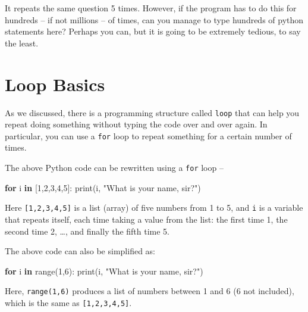\documentclass[
  letterpaper,
]{scrbook}
\newenvironment{Shaded}{\begin{snugshade}}{\end{snugshade}}
\newcommand{\BuiltInTok}[1]{\textcolor[rgb]{0.00,0.23,0.31}{#1}}
\newcommand{\ControlFlowTok}[1]{\textcolor[rgb]{0.00,0.23,0.31}{\textbf{#1}}}
\newcommand{\DecValTok}[1]{\textcolor[rgb]{0.68,0.00,0.00}{#1}}
\newcommand{\KeywordTok}[1]{\textcolor[rgb]{0.00,0.23,0.31}{\textbf{#1}}}
\newcommand{\NormalTok}[1]{\textcolor[rgb]{0.00,0.23,0.31}{#1}}
\newcommand{\StringTok}[1]{\textcolor[rgb]{0.13,0.47,0.30}{#1}}
\begin{document}
It repeats the same question 5 times. However, if the program has to do
this for hundreds -- if not millions -- of times, can you manage to type
hundreds of python statements here? Perhaps you can, but it is going to
be extremely tedious, to say the least.

\section*{Loop Basics}\label{loop-basics}


As we discussed, there is a programming structure called \texttt{loop}
that can help you repeat doing something without typing the code over
and over again. In particular, you can use a \texttt{for} loop to repeat
something for a certain number of times.

The above Python code can be rewritten using a \texttt{for} loop --

\begin{Shaded}
\begin{Highlighting}[]
\ControlFlowTok{for}\NormalTok{ i }\KeywordTok{in}\NormalTok{ [}\DecValTok{1}\NormalTok{,}\DecValTok{2}\NormalTok{,}\DecValTok{3}\NormalTok{,}\DecValTok{4}\NormalTok{,}\DecValTok{5}\NormalTok{]:}
    \BuiltInTok{print}\NormalTok{(i, }\StringTok{"What is your name, sir?"}\NormalTok{)}
\end{Highlighting}
\end{Shaded}

Here \texttt{{[}1,2,3,4,5{]}} is a list (array) of five numbers from 1
to 5, and \texttt{i} is a variable that repeats itself, each time taking
a value from the list: the first time 1, the second time 2, \ldots, and
finally the fifth time 5.

The above code can also be simplified as:

\begin{Shaded}
\begin{Highlighting}[]
\ControlFlowTok{for}\NormalTok{ i }\KeywordTok{in} \BuiltInTok{range}\NormalTok{(}\DecValTok{1}\NormalTok{,}\DecValTok{6}\NormalTok{):}
    \BuiltInTok{print}\NormalTok{(i, }\StringTok{"What is your name, sir?"}\NormalTok{)}
\end{Highlighting}
\end{Shaded}

Here, \texttt{range(1,6)} produces a list of numbers between 1 and 6 (6
not included), which is the same as \texttt{{[}1,2,3,4,5{]}}.
\end{document}
